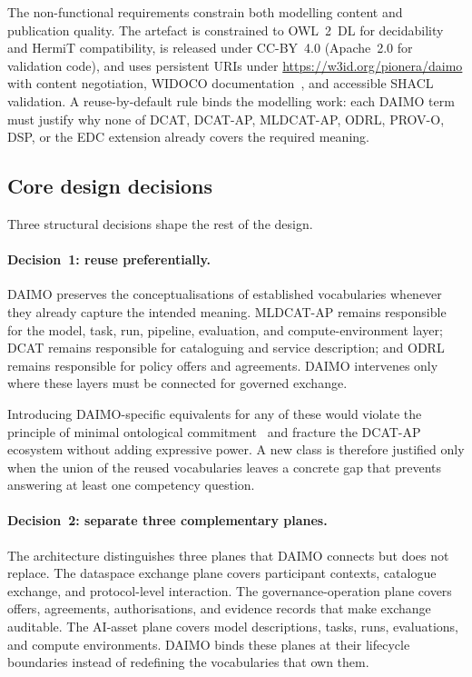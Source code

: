 \documentclass[Afour,sagev,times]{sagej}
\begin{document}
The non-functional requirements constrain both modelling content and publication quality. The artefact is constrained to OWL~2~DL for decidability and HermiT compatibility, is released under CC-BY~4.0 (Apache~2.0 for validation code), and uses persistent URIs under \url{https://w3id.org/pionera/daimo} with content negotiation, WIDOCO documentation~\cite{widoco}, and accessible SHACL validation. A reuse-by-default rule binds the modelling work: each DAIMO term must justify why none of DCAT, DCAT-AP, MLDCAT-AP, ODRL, PROV-O, DSP, or the EDC extension already covers the required meaning.

\subsection{Core design decisions}\label{sec:method-design}

Three structural decisions shape the rest of the design.

\paragraph{Decision~1: reuse preferentially.} DAIMO preserves the conceptualisations of established vocabularies whenever they already capture the intended meaning. MLDCAT-AP remains responsible for the model, task, run, pipeline, evaluation, and compute-environment layer; DCAT remains responsible for cataloguing and service description; and ODRL remains responsible for policy offers and agreements. DAIMO intervenes only where these layers must be connected for governed exchange.

Introducing DAIMO-specific equivalents for any of these would violate the principle of minimal ontological commitment~\cite{gruber95} and fracture the DCAT-AP ecosystem without adding expressive power. A new class is therefore justified only when the union of the reused vocabularies leaves a concrete gap that prevents answering at least one competency question.

\paragraph{Decision~2: separate three complementary planes.} The architecture distinguishes three planes that DAIMO connects but does not replace. The dataspace exchange plane covers participant contexts, catalogue exchange, and protocol-level interaction. The governance-operation plane covers offers, agreements, authorisations, and evidence records that make exchange auditable. The AI-asset plane covers model descriptions, tasks, runs, evaluations, and compute environments. DAIMO binds these planes at their lifecycle boundaries instead of redefining the vocabularies that own them.
\end{document}

